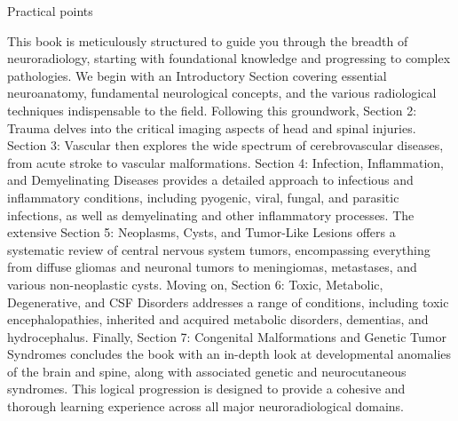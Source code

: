 \begin{tcolorbox}[colback=purple!5!white,colframe=purple!75!white,title=Practical points]
	Practical points
\end{tcolorbox}

This book is meticulously structured to guide you through the breadth of neuroradiology, starting with foundational knowledge and progressing to complex pathologies. We begin with an Introductory Section covering essential neuroanatomy, fundamental neurological concepts, and the various radiological techniques indispensable to the field. Following this groundwork, Section 2: Trauma delves into the critical imaging aspects of head and spinal injuries. Section 3: Vascular then explores the wide spectrum of cerebrovascular diseases, from acute stroke to vascular malformations. Section 4: Infection, Inflammation, and Demyelinating Diseases provides a detailed approach to infectious and inflammatory conditions, including pyogenic, viral, fungal, and parasitic infections, as well as demyelinating and other inflammatory processes. The extensive Section 5: Neoplasms, Cysts, and Tumor-Like Lesions offers a systematic review of central nervous system tumors, encompassing everything from diffuse gliomas and neuronal tumors to meningiomas, metastases, and various non-neoplastic cysts. Moving on, Section 6: Toxic, Metabolic, Degenerative, and CSF Disorders addresses a range of conditions, including toxic encephalopathies, inherited and acquired metabolic disorders, dementias, and hydrocephalus. Finally, Section 7: Congenital Malformations and Genetic Tumor Syndromes concludes the book with an in-depth look at developmental anomalies of the brain and spine, along with associated genetic and neurocutaneous syndromes. This logical progression is designed to provide a cohesive and thorough learning experience across all major neuroradiological domains.